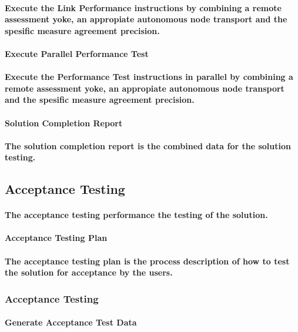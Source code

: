 \paragraph{Execute the Link Performance instructions by combining a remote assessment yoke, an appropiate autonomous node transport and the spesific measure agreement precision.}
\paragraph{Execute Parallel Performance Test}
\paragraph{Execute the Performance Test instructions in parallel by combining a remote assessment yoke, an appropiate autonomous node transport and the spesific measure agreement precision.}
\paragraph{Solution Completion Report}
\paragraph{The solution completion report is the combined data for the solution testing.}
\subsection{Acceptance Testing}
\paragraph{The acceptance testing performance the testing of the solution.}
\paragraph{Acceptance Testing Plan}
\paragraph{The acceptance testing plan is the process description of how to test the solution for acceptance by the users.}
\subsubsection{Acceptance Testing}
\paragraph{Generate Acceptance Test Data}
